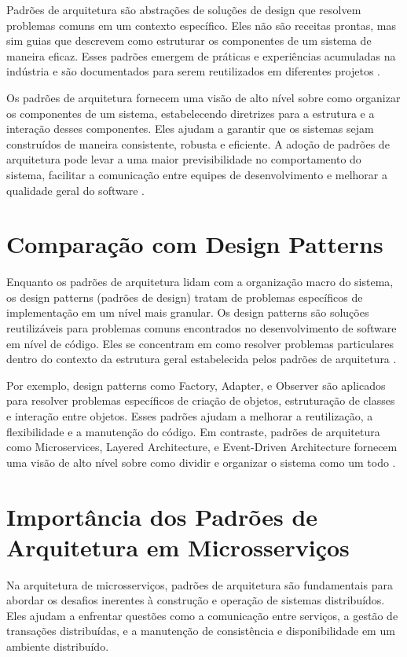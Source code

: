Padrões de arquitetura são abstrações de soluções de design que resolvem problemas comuns em um contexto específico. Eles não são receitas prontas, mas sim guias que descrevem como estruturar os componentes de um sistema de maneira eficaz. Esses padrões emergem de práticas e experiências acumuladas na indústria e são documentados para serem reutilizados em diferentes projetos \cite{buschmann1996}.

Os padrões de arquitetura fornecem uma visão de alto nível sobre como organizar os componentes de um sistema, estabelecendo diretrizes para a estrutura e a interação desses componentes. Eles ajudam a garantir que os sistemas sejam construídos de maneira consistente, robusta e eficiente. A adoção de padrões de arquitetura pode levar a uma maior previsibilidade no comportamento do sistema, facilitar a comunicação entre equipes de desenvolvimento e melhorar a qualidade geral do software \cite{fowler2011}.

\section{Comparação com Design Patterns}

Enquanto os padrões de arquitetura lidam com a organização macro do sistema, os design patterns (padrões de design) tratam de problemas específicos de implementação em um nível mais granular. Os design patterns são soluções reutilizáveis para problemas comuns encontrados no desenvolvimento de software em nível de código. Eles se concentram em como resolver problemas particulares dentro do contexto da estrutura geral estabelecida pelos padrões de arquitetura \cite{gamma1994}.

Por exemplo, design patterns como Factory, Adapter, e Observer são aplicados para resolver problemas específicos de criação de objetos, estruturação de classes e interação entre objetos. Esses padrões ajudam a melhorar a reutilização, a flexibilidade e a manutenção do código. Em contraste, padrões de arquitetura como Microservices, Layered Architecture, e Event-Driven Architecture fornecem uma visão de alto nível sobre como dividir e organizar o sistema como um todo \cite{fowler2011}.

\section{Importância dos Padrões de Arquitetura em Microsserviços}

Na arquitetura de microsserviços, padrões de arquitetura são fundamentais para abordar os desafios inerentes à construção e operação de sistemas distribuídos. Eles ajudam a enfrentar questões como a comunicação entre serviços, a gestão de transações distribuídas, e a manutenção de consistência e disponibilidade em um ambiente distribuído.

